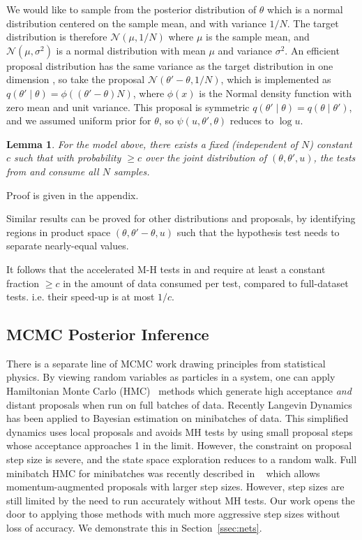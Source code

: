 \documentclass{article}
\newtheorem{lemma}{Lemma}
\begin{document}
We would like to sample from the posterior distribution of $\theta$
which is a normal distribution centered on the sample mean, and with
variance $1/N$.  The target distribution is therefore
$\mathcal{N}(\mu,1/N)$ where $\mu$ is the sample mean, and $\mathcal{N}(\mu,\sigma^2)$ is a
normal distribution with mean $\mu$ and variance $\sigma^2$.  An efficient
proposal distribution has the same variance as the target distribution in one dimension
\cite{OptimalScaling01}, so take the proposal
$\mathcal{N}(\theta'-\theta,1/N)$, which is implemented as $q(\theta'\mid\theta) =
\phi((\theta'-\theta)N)$, where $\phi(x)$ is the Normal density
function with zero mean and unit variance. This proposal is symmetric
$q(\theta'\mid\theta)=q(\theta\mid\theta')$, and we assumed uniform
prior for $\theta$, so $\psi(u,\theta',\theta)$ reduces to $\log
u$.

\begin{lemma}\label{lem:efficienty_cutting}
  For the model above, there
  exists a fixed (independent of $N$) constant $c$ such that with probability $ \geq c$ over the joint
  distribution of $(\theta, \theta', u)$, the
  tests from \cite{icml2014c1_bardenet14} and \cite{cutting_mh_2014} consume all $N$ samples. 
\end{lemma}
Proof is given in the appendix.

Similar results can be proved for other distributions and proposals, by identifying
regions in product space $(\theta,\theta'-\theta,u)$ such that the hypothesis test
needs to separate nearly-equal values. 

It follows that the accelerated M-H tests in \cite{icml2014c1_bardenet14} and
\cite{cutting_mh_2014} require at least a constant fraction $\geq c$
in the amount of data consumed per test, compared to full-dataset tests.
i.e. their speed-up is at most $1/c$.

\subsection{MCMC Posterior Inference}
There is a separate line of MCMC work drawing principles from
statistical physics. By viewing random variables as particles in a
system, one can apply Hamiltonian Monte Carlo
(HMC)~\cite{mcmc_hamiltonian_2010} methods which generate high
acceptance \emph{and} distant proposals when run on full batches of
data. Recently Langevin
Dynamics~\cite{langevin_2011,conf/icml/AhnBW12} has been applied to
Bayesian estimation on minibatches of data. This simplified dynamics
uses local proposals and avoids MH tests by using small proposal steps
whose acceptance approaches 1 in the limit. However, the constraint on
proposal step size is severe, and the state space exploration reduces
to a random walk. Full minibatch HMC for minibatches was recently
described in ~\cite{sghmc_2014} which allows momentum-augmented
proposals with larger step sizes. However, step sizes are still
limited by the need to run accurately without MH tests.
Our work opens the door to applying those methods with much
more aggressive step sizes without loss of accuracy. We demonstrate
this in Section~\ref{ssec:nets}.
\end{document}
